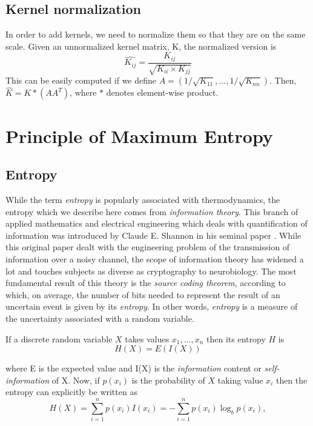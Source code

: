 \subsection{Kernel normalization}
In order to add kernels, we need to normalize them so that they are on the same scale. Given an unnormalized kernel matrix, K, the normalized version is
\begin{equation}
    \hat{K_{ij}} = \frac{K_{ij}}{\sqrt{K_{ii} \times K_{jj}}}
\end{equation} 
This can be easily computed if we define $A = (1/\sqrt{K_{11}}, \dots, 1/\sqrt{K_{nn}})$. Then, $\hat{K} = K \ast (AA^{T})$, where $\ast$ denotes element-wise product.
 
\section{Principle of Maximum Entropy}
\subsection{Entropy} \label{information_theory}
While the term \textit{entropy} is popularly associated with thermodynamics, the entropy which we describe here comes from \textit{information theory}. This branch of applied mathematics and electrical engineering which deals with quantification of information was introduced by Claude E. Shannon in his seminal paper \citep{sha48mathematical}. While this original paper dealt with the engineering problem of the transmission of information over a noisy channel, the scope of information theory has widened a lot and touches subjects as diverse as cryptography to neurobiology. The most fundamental result of this theory is the \textit{source coding theorem}, according to which, on average, the number of bits needed to represent the result of an uncertain event is given by its \textit{entropy}. In other words, \textit{entropy} is a measure of the uncertainty associated with a random variable. 

If a discrete random variable $X$ takes values $x_{1}, \dots, x_{n}$ then its entropy $H$ is
\begin{displaymath}
    H(X) = E(I(X))
\end{displaymath}

where E is the expected value and I(X) is the \textit{information} content or \textit{self-information} of X. Now, if $p(x_i)$ is the probability of $X$ taking value $x_{i}$ then the entropy can explicitly be written as
\begin{displaymath}
    H(X) = \sum_{i=1}^n p(x_i)I(x_i) = -\sum_{i=1}^n p(x_i) \log_b p(x_i),
\end{displaymath}

